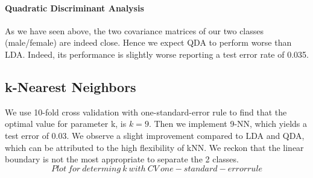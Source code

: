 \paragraph{Quadratic Discriminant Analysis}
As we have seen above, the two covariance matrices of our two classes (male/female) are indeed close. Hence we expect QDA to perform worse than LDA. Indeed, its performance is slightly worse reporting a test error rate of \num{0.035}.


\subsection{k-Nearest Neighbors}
We use \num{10}-fold cross validation with one-standard-error rule to find that the optimal value for parameter k, is $k=9$. Then we implement \num{9}-NN, which yields a test error of \num{0.03}. We observe a slight improvement compared to LDA and QDA, which can be attributed to the high flexibility of kNN. We reckon that the linear boundary is not the most appropriate to separate the \num{2} classes.
$$ Plot ~ for ~ determing ~ k ~ with ~ CV~ one-standard-error rule $$ 

